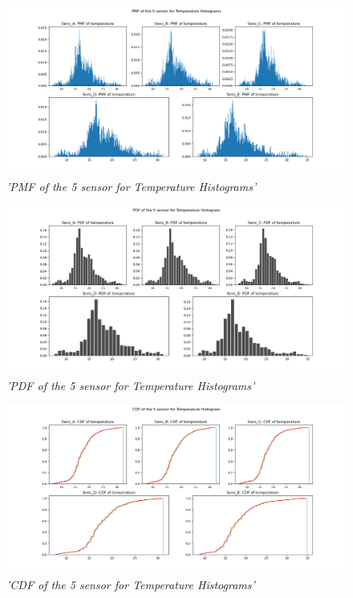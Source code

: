 \documentclass[a4paper,12pt]{article}
\begin{document}
\begin{figure}[H]
\centering
\includegraphics[width=\textwidth]{Graphs/PMF_of_the_5_sensor_-_Temperature_Histogram.png}
\caption{\it'PMF of the 5 sensor for Temperature Histograms'}
\end{figure}




\begin{figure}[H]
\centering
\includegraphics[width=\textwidth]{Graphs/PDF_of_the_5_sensor_-_Temperature_Histogram.png}
\caption{\it'PDF of the 5 sensor for Temperature Histograms'}
\end{figure}




\begin{figure}[H]
\centering
\includegraphics[width=\textwidth]{Graphs/CDF_of_the_5_sensor_-_Temperature_Histogram.png}
\caption{\it'CDF of the 5 sensor for Temperature Histograms'}
\end{figure}
\end{document}
